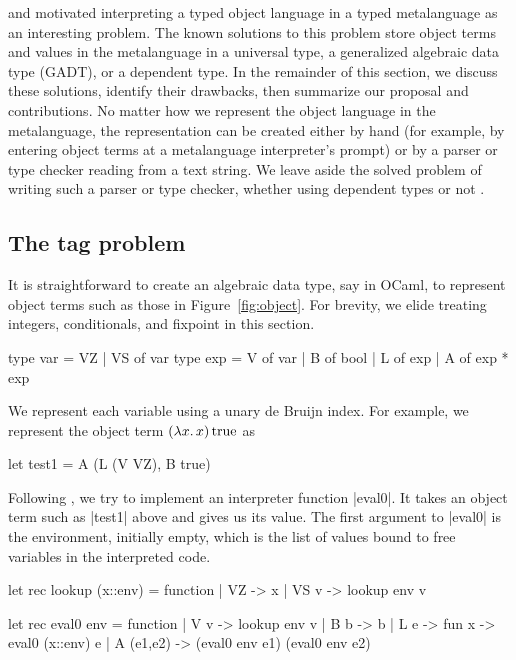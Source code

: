 \documentclass[preprint]{sigplanconf}
\newcommand{\oleg}[1]{{\it [Oleg says: #1]}}
\newcommand{\fun}[1]{\mathopen{\lambda\mathord{#1}.\,}}
\newcommand{\True}{\mathinner{\mathrm{true}}}
\begin{document}
 and \citet{xi-guarded} motivated interpreting
a typed object language in a typed metalanguage as an interesting
problem.  The known solutions to this problem store object terms and
values in the metalanguage in a universal type, a generalized algebraic
data type (GADT), or a dependent type.  In the remainder of this section,
we discuss these solutions, identify their drawbacks, then summarize our
proposal and contributions.  
No matter how we represent the object language in the
metalanguage, the representation can be created either by hand (for example, by
entering object terms at a metalanguage interpreter's prompt) or
by a parser or type checker reading from a text string.
We leave aside the solved problem of writing such a parser or type checker,
whether using dependent types \citep{WalidICFP02} or not \citep{baars-typing}.

\subsection{The tag problem}\label{tagproblem}


It is straightforward to create an algebraic data type, say in OCaml, to
represent object terms such as those in Figure~\ref{fig:object}.
For brevity, we elide treating integers, conditionals, and fixpoint in
this section.
\begin{code}
type var = VZ | VS of var
type exp = V of var | B of bool
         | L of exp | A of exp * exp
\end{code}
We represent each variable using a unary de Bruijn index.
For example, we represent the object term $(\fun{x}x)\True$ as
\begin{code}
let test1 = A (L (V VZ), B true)
\end{code}

Following \citet{WalidICFP02},
we try to implement an interpreter function |eval0|. It takes
an object term such as |test1| above and gives us its value.
The first argument to |eval0| is the environment, initially empty,
which is the list of values bound to free variables in the
interpreted code.
\begin{code}
let rec lookup (x::env) = function
| VZ   -> x
| VS v -> lookup env v

let rec eval0 env = function
| V v       -> lookup env v
| B b       -> b 
| L e       -> fun x -> eval0 (x::env) e
| A (e1,e2) -> (eval0 env e1) (eval0 env e2) 
\end{code}
\end{document}
